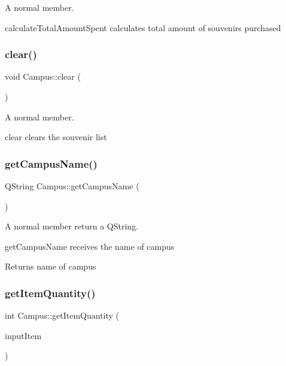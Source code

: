 A normal member. 

calculate\+Total\+Amount\+Spent calculates total amount of souvenirs purchased \mbox{\label{class_campus_ac6d65337d2c655c92e476375ee4d355e}} 
\subsubsection{\texorpdfstring{clear()}{clear()}}
{\footnotesize\ttfamily void Campus\+::clear (\begin{DoxyParamCaption}{ }\end{DoxyParamCaption})}



A normal member. 

clear clears the souvenir list \mbox{\label{class_campus_a809e348ff4c9d6c91aef834169c9ecf3}} 
\subsubsection{\texorpdfstring{get\+Campus\+Name()}{getCampusName()}}
{\footnotesize\ttfamily Q\+String Campus\+::get\+Campus\+Name (\begin{DoxyParamCaption}{ }\end{DoxyParamCaption})}



A normal member return a Q\+String. 

get\+Campus\+Name receives the name of campus \begin{DoxyReturn}{Returns}
name of campus 
\end{DoxyReturn}
\mbox{\label{class_campus_a7d10a879ce94effb031a02ef58261902}} 
\subsubsection{\texorpdfstring{get\+Item\+Quantity()}{getItemQuantity()}}
{\footnotesize\ttfamily int Campus\+::get\+Item\+Quantity (\begin{DoxyParamCaption}\item[{Q\+String}]{input\+Item }\end{DoxyParamCaption})}




